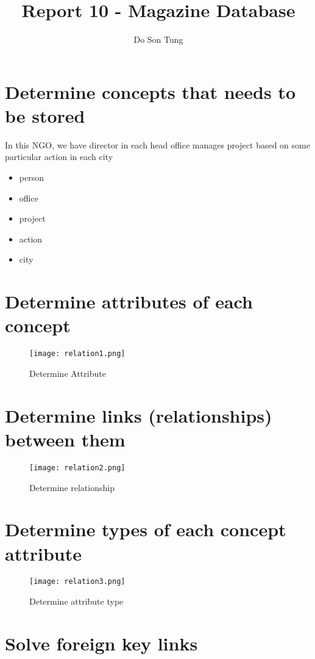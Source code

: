 \documentclass[12pt]{article}
\title{Report 10 - Magazine Database}
\author{Do Son Tung}
\date{} %
\begin{document}
\maketitle

\section{Determine concepts that needs to be stored}
In this NGO, we have director in each head office manages project based on some particular action in each city

\begin{itemize}
\item person
\item office
\item project
\item action
\item city
\end{itemize}

\section{Determine attributes of each concept}
\begin{figure}[H]
  \texttt{[image: relation1.png]}
  \caption{Determine Attribute}
  \label{fig:relation1}
\end{figure}

\section{Determine links (relationships) between them}
\begin{figure}[H]
  \texttt{[image: relation2.png]}
  \caption{Determine relationship}
  \label{fig:relation2}
\end{figure}

\section{Determine types of each concept attribute}
\begin{figure}[H]
  \texttt{[image: relation3.png]}
  \caption{Determine attribute type}
  \label{fig:relation3}
\end{figure}

\pagebreak


\section{Solve foreign key links}
\end{document}
